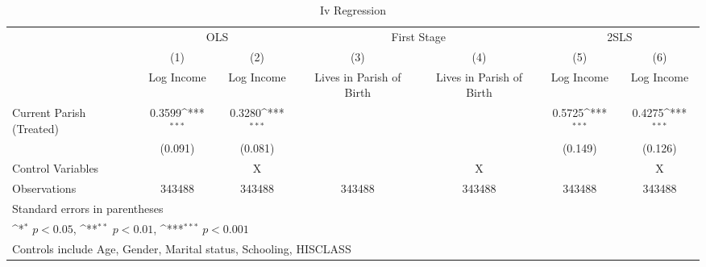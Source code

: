 \begin{table}[htbp]\centering
\def\sym#1{\ifmmode^{#1}\else\(^{#1}\)\fi}
\caption{Iv Regression \label{columns}}
\begin{tabular}{l*{6}{c}}
\hline\hline
                    &\multicolumn{2}{c}{OLS}                    &\multicolumn{2}{c}{First Stage}            &\multicolumn{2}{c}{2SLS}                   \\\cmidrule(lr){2-3}\cmidrule(lr){4-5}\cmidrule(lr){6-7}
                    &\multicolumn{1}{c}{(1)}&\multicolumn{1}{c}{(2)}&\multicolumn{1}{c}{(3)}&\multicolumn{1}{c}{(4)}&\multicolumn{1}{c}{(5)}&\multicolumn{1}{c}{(6)}\\
                    &\multicolumn{1}{c}{Log Income}&\multicolumn{1}{c}{Log Income}&\multicolumn{1}{c}{Lives in Parish of Birth}&\multicolumn{1}{c}{Lives in Parish of Birth}&\multicolumn{1}{c}{Log Income}&\multicolumn{1}{c}{Log Income}\\
\hline
Current Parish (Treated)&      0.3599\sym{***}&      0.3280\sym{***}&                     &                     &      0.5725\sym{***}&      0.4275\sym{***}\\
                    &     (0.091)         &     (0.081)         &                     &                     &     (0.149)         &     (0.126)         \\
[1em]

\hline
Control Variables &         &    X      &      &    X    &    & X   \\
\hline
Observations        &      343488         &      343488         &      343488         &      343488         &      343488         &      343488         \\
\hline\hline
\multicolumn{7}{l}{\footnotesize Standard errors in parentheses}\\
\multicolumn{7}{l}{\footnotesize \sym{*} \(p<0.05\), \sym{**} \(p<0.01\), \sym{***} \(p<0.001\)}\\
\multicolumn{5}{l}{\footnotesize Controls include Age, Gender, Marital status, Schooling, HISCLASS}\\
\end{tabular}
\end{table}
